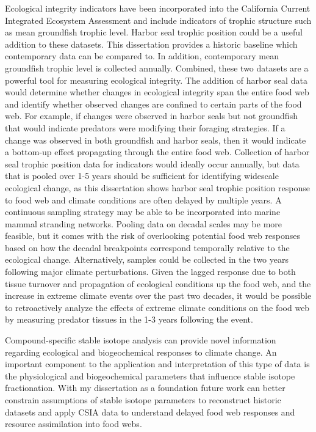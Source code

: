 \documentclass [11pt, proquest] {uwthesis}[2015/03/03]
\begin{document}
Ecological integrity indicators have been incorporated into the
California Current Integrated Ecosystem Assessment and include
indicators of trophic structure such as mean groundfish trophic level.
Harbor seal trophic position could be a useful addition to these
datasets. This dissertation provides a historic baseline which
contemporary data can be compared to. In addition, contemporary mean
groundfish trophic level is collected annually. Combined, these two
datasets are a powerful tool for measuring ecological integrity. The
addition of harbor seal data would determine whether changes in
ecological integrity span the entire food web and identify whether
observed changes are confined to certain parts of the food web. For
example, if changes were observed in harbor seals but not groundfish
that would indicate predators were modifying their foraging strategies.
If a change was observed in both groundfish and harbor seals, then it
would indicate a bottom-up effect propagating through the entire food
web. Collection of harbor seal trophic position data for indicators
would ideally occur annually, but data that is pooled over 1-5 years
should be sufficient for identifying widescale ecological change, as
this dissertation shows harbor seal trophic position response to food
web and climate conditions are often delayed by multiple years. A
continuous sampling strategy may be able to be incorporated into marine
mammal stranding networks. Pooling data on decadal scales may be more
feasible, but it comes with the risk of overlooking potential food web
responses based on how the decadal breakpoints correspond temporally
relative to the ecological change. Alternatively, samples could be
collected in the two years following major climate perturbations. Given
the lagged response due to both tissue turnover and propagation of
ecological conditions up the food web, and the increase in extreme
climate events over the past two decades, it would be possible to
retroactively analyze the effects of extreme climate conditions on the
food web by measuring predator tissues in the 1-3 years following the
event.

Compound-specific stable isotope analysis can provide novel information
regarding ecological and biogeochemical responses to climate change. An
important component to the application and interpretation of this type
of data is the physiological and biogeochemical parameters that
influence stable isotope fractionation. With my dissertation as a
foundation future work can better constrain assumptions of stable
isotope parameters to reconstruct historic datasets and apply CSIA data
to understand delayed food web responses and resource assimilation into
food webs.
\end{document}
